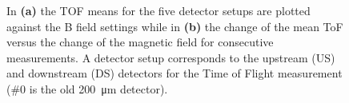 \begin{refsection}
        \begin{figure}
            \centering
            \hfill
            \caption{In \textbf{(a)} the TOF means for the five detector setups are plotted against the B field settings while in \textbf{(b)} the change of the mean ToF versus the change of the magnetic field for consecutive measurements. A detector setup corresponds to the upstream (US) and downstream (DS) detectors for the Time of Flight measurement (\#0 is the old \SI{200}{\micro\meter} detector).}
        \end{figure}


\end{refsection}
